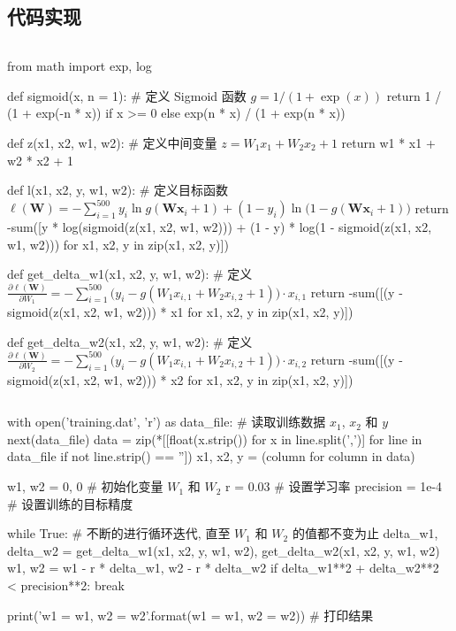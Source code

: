 \subsection{代码实现}
\begin{frame}[fragile]{\insertsection}{\insertsubsection}
\begin{columns}
\column{\dimexpr\paperwidth-10pt}\vspace{-20pt}
\begin{pythoncode}[fontsize = \fontsize{8}{8}\selectfont]
from math import exp, log

def sigmoid(x, n = 1): # 定义 Sigmoid 函数 $g = 1/(1 + \exp(x))$
  return 1 / (1 + exp(-n * x)) if x >= 0 else exp(n * x) / (1 + exp(n * x))

def z(x1, x2, w1, w2): # 定义中间变量 $z = W_1x_1 + W_2x_2 + 1$
  return w1 * x1 + w2 * x2 + 1

def l(x1, x2, y, w1, w2): # 定义目标函数 $\ell(\bm{W}) =  -\sum_{i = 1}^{500} y_i\ln g(\bm{W}\bm{x}_i + 1) + (1 - y_i)\ln\big(1 - g(\bm{W}\bm{x}_i + 1)\big)$
  return -sum([y * log(sigmoid(z(x1, x2, w1, w2))) + (1 - y) * log(1 - sigmoid(z(x1, x2, w1, w2))) for x1, x2, y in zip(x1, x2, y)])

def get_delta_w1(x1, x2, y, w1, w2): # 定义 $\frac{\partial \ell(\bm{W})}{\partial W_1} = -\sum_{i = 1}^{500} \big(y_i - g(W_1x_{i,1} + W_2x_{i,2} + 1)\big)\cdot x_{i,1}$
  return -sum([(y - sigmoid(z(x1, x2, w1, w2))) * x1 for x1, x2, y in zip(x1, x2, y)])

def get_delta_w2(x1, x2, y, w1, w2): # 定义 $\frac{\partial \ell(\bm{W})}{\partial W_2} = -\sum_{i = 1}^{500} \big(y_i - g(W_1x_{i,1} + W_2x_{i,2} + 1)\big)\cdot x_{i,2}$
  return -sum([(y - sigmoid(z(x1, x2, w1, w2))) * x2 for x1, x2, y in zip(x1, x2, y)])
\end{pythoncode}
\end{columns}
\end{frame}

\begin{frame}[fragile]{\insertsection}{\insertsubsection}
\begin{columns}
\column{\dimexpr\paperwidth-10pt}\vspace{-20pt}
\begin{pythoncode}[fontsize = \fontsize{8}{8}\selectfont]
with open('training.dat', 'r') as data_file: # 读取训练数据 $x_1$, $x_2$ 和 $y$
  next(data_file)
  data = zip(*[[float(x.strip()) for x in line.split(',')] for line in data_file if not line.strip() == ''])
x1, x2, y = (column for column in data)

w1, w2 = 0, 0 # 初始化变量 $W_1$ 和 $W_2$
r = 0.03 # 设置学习率
precision = 1e-4 # 设置训练的目标精度

while True: # 不断的进行循环迭代, 直至 $W_1$ 和 $W_2$ 的值都不变为止
  delta_w1, delta_w2 = get_delta_w1(x1, x2, y, w1, w2), get_delta_w2(x1, x2, y, w1, w2)
  w1, w2 = w1 - r * delta_w1, w2 - r * delta_w2
  if delta_w1**2 + delta_w2**2 < precision**2:
    break

print('w1 = {w1}, w2 = {w2}'.format(w1 = w1, w2 = w2)) # 打印结果
\end{pythoncode}
\end{columns}
\end{frame}

